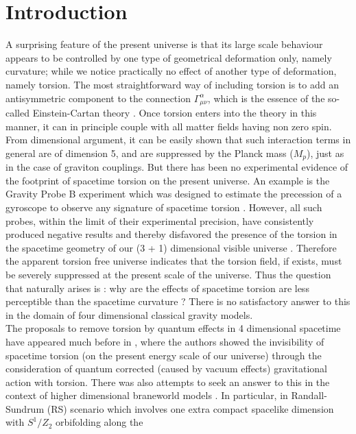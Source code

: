 \documentclass[a4paper]{article}
\begin{document}
\section{Introduction}
A surprising feature of the present universe is that its large scale behaviour appears to be 
controlled by one type of geometrical deformation only, namely curvature; while we notice practically no effect of another type 
of deformation, namely torsion. The most straightforward way of including torsion is to add an antisymmetric
component to the connection $\Gamma^{\alpha}_{\mu\nu}$, which is the essence of the so-called Einstein-Cartan theory \cite{hehl_report}. 
Once torsion enters into the theory in this manner, it can in principle couple with all matter fields having 
non zero spin. From dimensional argument, it can be easily shown that such interaction terms in general are of dimension 5, and are 
suppressed by the Planck mass ($M_p$), just as in the case of graviton couplings. But there has 
been no experimental evidence of the footprint of spacetime torsion on the present universe. An example is the 
Gravity Probe B experiment which was designed to estimate the precession of a gyroscope to observe any 
signature of spacetime torsion \cite{everitt}. However, all such probes, within the limit of their experimental precision, 
have consistently produced negative results and thereby disfavored the presence of the torsion 
in the spacetime geometry of our (3 + 1) dimensional visible universe \cite{lanmerzahl,mao,hehl}. Therefore the apparent torsion free universe 
indicates that the torsion field, if exists, must be severely suppressed at the present scale of the universe. 
Thus the question that naturally arises is : why are the effects of spacetime torsion are less perceptible than the spacetime curvature ? 
There is no satisfactory answer to this in the domain of four dimensional classical gravity models.\\
The proposals to remove torsion by quantum effects in 4 dimensional spacetime have appeared much before in \cite{buchbinder}, where 
the authors showed the invisibility of spacetime torsion (on the present energy scale of our universe) through the consideration of 
quantum corrected (caused by vacuum effects) gravitational action with torsion. There was also attempts to seek 
an answer to this in the context of higher dimensional braneworld models 
\cite{ssg_prl,horava,RS,kaloper,chodos,ssg_generalized,csaki}. In particular, in 
Randall-Sundrum (RS) scenario \cite{RS} which involves one extra compact spacelike dimension with $S^1/Z_2$ orbifolding along the 
\end{document}
